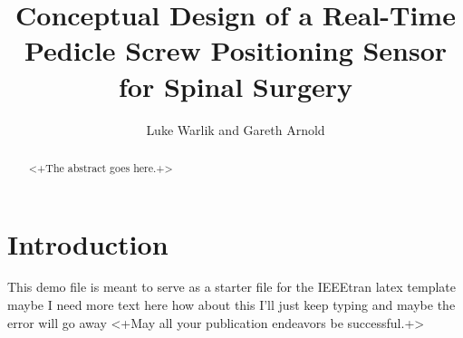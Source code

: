 \documentclass[conference, a4paper]{IEEEtran}
\begin{document}
%
\title{Conceptual Design of a Real-Time Pedicle Screw Positioning Sensor for
Spinal Surgery}
\author{Luke Warlik and Gareth Arnold}


\maketitle


\begin{abstract}
	<+The abstract goes here.+>
\end{abstract}


\section{Introduction}
This demo file is meant to serve as a starter file for the
IEEEtran latex template maybe I need more text here how about this
I'll just keep typing and maybe the error will go away
<+May all your publication endeavors be successful.+>




%
%


\end{document}

